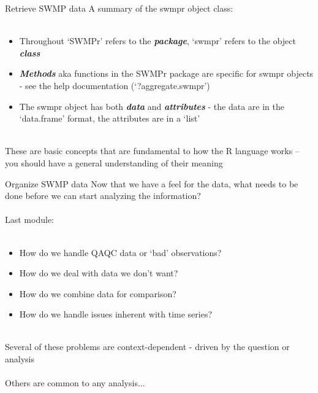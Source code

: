 \documentclass[xcolor=svgnames]{beamer}\usepackage[]{graphicx}\usepackage[]{color}
\newcommand{\Bigtxt}[1]{\textbf{\textit{#1}}}
\begin{document}
\begin{frame}[containsverbatim]{Retrieve SWMP data}
A summary of the swmpr object class:\\~\\
\begin{itemize}
\item Throughout `SWMPr' refers to the \Bigtxt{package}, `swmpr' refers to the object \Bigtxt{class}
\item \Bigtxt{Methods} aka functions in the SWMPr package are specific for swmpr objects - see the help documentation (`?aggregate.swmpr')
\item The swmpr object has both \Bigtxt{data} and \Bigtxt{attributes} - the data are in the `data.frame' format, the attributes are in a `list'\\~\\
\end{itemize}
These are basic concepts that are fundamental to how the R language works -- you should have a general understanding of their meaning
\end{frame}

\begin{frame}{Organize SWMP data}
Now that we have a feel for the data, what needs to be done before we can start analyzing the information? \\~\\
Last module: \\~\\
\begin{itemize}
\item How do we handle QAQC data or `bad' observations?
\item How do we deal with data we don't want?  
\item How do we combine data for comparison?
\item How do we handle issues inherent with time series? \\~\\
\end{itemize}
Several of these problems are context-dependent - driven by the question or analysis \\~\\
Others are common to any analysis...
\end{frame}
\end{document}
